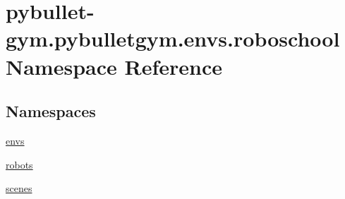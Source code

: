 \hypertarget{namespacepybullet-gym_1_1pybulletgym_1_1envs_1_1roboschool}{}\section{pybullet-\/gym.pybulletgym.\+envs.\+roboschool Namespace Reference}
\label{namespacepybullet-gym_1_1pybulletgym_1_1envs_1_1roboschool}
\subsection*{Namespaces}
\begin{DoxyCompactItemize}
\item 
 \hyperlink{namespacepybullet-gym_1_1pybulletgym_1_1envs_1_1roboschool_1_1envs}{envs}
\item 
 \hyperlink{namespacepybullet-gym_1_1pybulletgym_1_1envs_1_1roboschool_1_1robots}{robots}
\item 
 \hyperlink{namespacepybullet-gym_1_1pybulletgym_1_1envs_1_1roboschool_1_1scenes}{scenes}
\end{DoxyCompactItemize}
